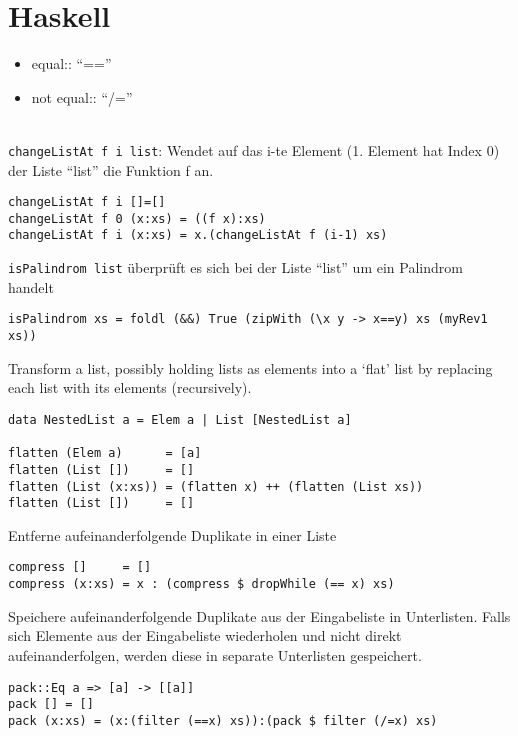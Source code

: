 \chapter{Haskell}
\begin{itemize}
	\item equal:: \enquote{==}
	\item not equal:: \enquote{/=}
\end{itemize}

\\
\texttt{changeListAt f i list}: Wendet auf das i-te Element (1. Element hat Index 0) der Liste \enquote{list} die Funktion f an.
\begin{lstlisting}
changeListAt f i []=[]
changeListAt f 0 (x:xs) = ((f x):xs)
changeListAt f i (x:xs) = x.(changeListAt f (i-1) xs)
\end{lstlisting}

\texttt{isPalindrom list} überprüft es sich bei der Liste \enquote{list} um ein Palindrom handelt 
\begin{lstlisting}
isPalindrom xs = foldl (&&) True (zipWith (\x y -> x==y) xs (myRev1 xs))
\end{lstlisting}

Transform a list, possibly holding lists as elements into a `flat' list by replacing each list with its elements (recursively). 
\begin{lstlisting}
data NestedList a = Elem a | List [NestedList a]

flatten (Elem a)      = [a]
flatten (List [])     = []
flatten (List (x:xs)) = (flatten x) ++ (flatten (List xs))
flatten (List [])     = []
\end{lstlisting}

Entferne aufeinanderfolgende Duplikate in einer Liste
\begin{lstlisting}
compress []     = []
compress (x:xs) = x : (compress $ dropWhile (== x) xs)
\end{lstlisting}

Speichere aufeinanderfolgende Duplikate aus der Eingabeliste in Unterlisten. Falls sich Elemente aus der Eingabeliste wiederholen und nicht direkt aufeinanderfolgen, werden diese in separate Unterlisten gespeichert.
\begin{lstlisting}
pack::Eq a => [a] -> [[a]]
pack [] = []
pack (x:xs) = (x:(filter (==x) xs)):(pack $ filter (/=x) xs)
\end{lstlisting}

